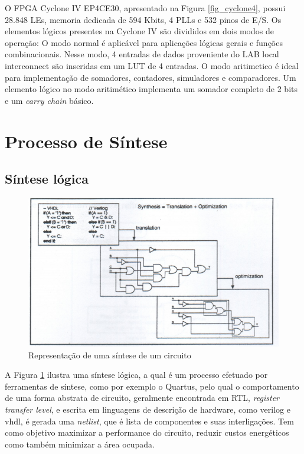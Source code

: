 \documentclass[
	11pt,				%
	openany,			%
	oneside,
	a4paper,			%
	chapter=TITLE,		%
	section=TITLE,		%
	english,			%
	brazil				%
	]{abntex2}
\begin{document}
O FPGA Cyclone IV EP4CE30, apresentado na Figura \ref{fig_cyclone4}, possui 28.848 LEs,
memoria dedicada de 594 Kbits, 4 PLLs e 532 pinos de E/S.
Os elementos lógicos presentes na Cyclone IV são divididos em dois modos de operação:
O modo normal é aplicável para aplicações lógicas gerais e funções combinacionais. Nesse modo, 4 entradas de dados proveniente do LAB local interconnect são inseridas em um LUT de 4 entradas. 
O modo aritimetico é ideal para implementação de somadores, contadores, simuladores e comparadores. Um elemento lógico no modo aritimético implementa um somador completo de 2 bits e um \textit{carry chain} básico. \cite{cyclone4altera}



\section{Processo de Síntese}
\subsection{Síntese lógica}
\begin{figure}[htb]
	\caption{\label{fig_sintese}Representação de uma síntese de um circuito}
	\begin{center}
	    \includegraphics[scale=0.5]{sintese.PNG}
	\end{center}
\end{figure}

A Figura \ref{fig_sintese} ilustra uma síntese lógica, a qual é um processo efetuado por ferramentas de síntese, como por exemplo o Quartus, pelo qual o comportamento de uma forma abstrata de circuito, geralmente encontrada em RTL, \textit{register transfer level}, e escrita em linguagens de descrição de hardware, como verilog e vhdl, é gerada uma \textit{netlist}, que é lista de componentes e suas interligações. Tem como objetivo maximizar a performance do circuito, reduzir custos energéticos como também minimizar a área ocupada.
\end{document}
